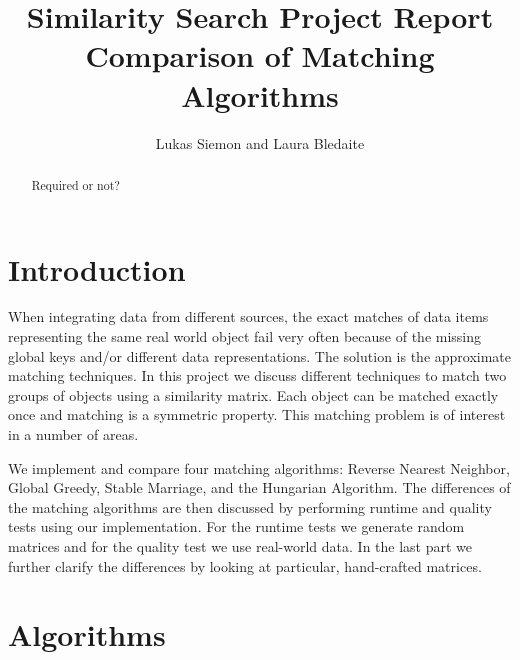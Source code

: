 \documentclass[a4paper,11pt]{article}
\newcommand\etc{\textsl{etc}}
\begin{document}
\title{
  \textbf{\large Similarity Search Project Report}\\
  Comparison of Matching Algorithms
}

\author{Lukas Siemon and Laura Bledaite}
\maketitle

\begin{abstract}
Required or not?
\end{abstract}

\section{Introduction}

When integrating data from different sources, the exact matches of data items representing the same real world object fail very often because of the missing global keys and/or different data representations. The solution is the approximate matching techniques. In this project we discuss different techniques to match two groups of objects using a similarity matrix. Each object can be matched exactly once and matching is a symmetric property. This matching problem is of interest in a number of areas.

We implement and compare four matching algorithms: Reverse Nearest Neighbor, Global Greedy, Stable Marriage, and the Hungarian Algorithm. 
The differences of the matching algorithms are then discussed by performing runtime and quality tests using our implementation. For the runtime tests we generate random matrices and for the quality test we use real-world data. In the last part we further clarify the differences by looking at particular, hand-crafted matrices.

 

\section{Algorithms}
\end{document}
